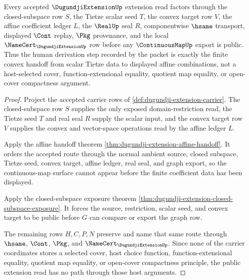 \begin{theorem}
\label{thm:dugundji-extension-finite-convex-handoff}
Every accepted $\DugundjiExtensionUp$ extension read factors through the closed-subspace row $S$, the Tietze scalar seed $T$, the convex target row $V$, the affine coefficient ledger $L$, the $\RealUp$ seal $R$, componentwise $\hsame$ transport, displayed $\Cont$ replay, $\Pkg$ provenance, and the local $\NameCert_{\DugundjiExtensionUp}$ row before any $\ContinuousMapUp$ export is public. Thus the human derivation step recorded by the packet is exactly the finite convex handoff from scalar Tietze data to displayed affine combinations, not a host-selected cover, function-extensional equality, quotient map equality, or open-cover compactness argument.
\end{theorem}
\begin{proof}
Project the accepted carrier rows of \autoref{def:dugundji-extension-carrier}. The closed-subspace row $S$ supplies the only exposed domain-restriction read, the Tietze seed $T$ and real seal $R$ supply the scalar input, and the convex target row $V$ supplies the convex and vector-space operations read by the affine ledger $L$.

Apply the affine handoff theorem \autoref{thm:dugundji-extension-affine-handoff}. It orders the accepted route through the normal ambient source, closed subspace, Tietze seed, convex target, affine ledger, real seal, and graph export, so the continuous-map surface cannot appear before the finite coefficient data has been displayed.

Apply the closed-subspace exposure theorem \autoref{thm:dugundji-extension-closed-subspace-exposure}. It forces the source, restriction, scalar seed, and convex target to be public before $G$ can compare or export the graph row.

The remaining rows $H,C,P,N$ preserve and name that same route through $\hsame$, $\Cont$, $\Pkg$, and $\NameCert_{\DugundjiExtensionUp}$. Since none of the carrier coordinates stores a selected cover, host choice function, function-extensional equality, quotient map equality, or open-cover compactness principle, the public extension read has no path through those host arguments.
\end{proof}


